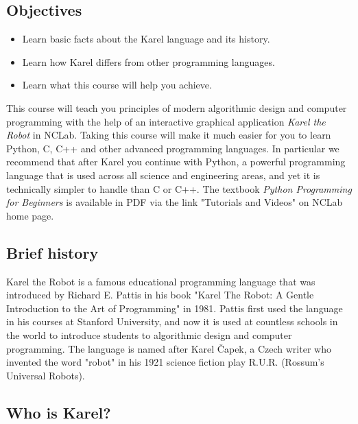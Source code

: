 \documentclass[article,A4,12pt]{llncs}
\begin{document}
\subsection{Objectives} 

\begin{itemize}
\item Learn basic facts about the Karel language and its history. 
\item Learn how Karel differs from other programming languages.
\item Learn what this course will help you achieve.
\end{itemize}
This course will teach you principles of modern algorithmic design and  
computer programming with the help of an interactive graphical application 
{\em Karel the Robot} in NCLab. Taking this course will make it much easier 
for you to learn Python, C, C++ and other advanced programming languages. In particular we 
recommend that after Karel you continue with Python, a powerful programming 
language that is used across all science and engineering areas, and yet it is 
technically simpler to handle than C or C++. The textbook
{\em Python Programming for Beginners} is available in PDF via the link 
"Tutorials and Videos" on NCLab home page.

\subsection{Brief history}

Karel the Robot is a famous educational programming language that was introduced by Richard E. 
Pattis in his book "Karel The Robot: A Gentle Introduction to the Art of Programming" in 1981. 
Pattis first used the language in his courses at Stanford University, and now it is used at 
countless schools in the world to introduce students to algorithmic design and computer programming. 
The language is named after Karel \v{C}apek, a Czech writer who invented the word "robot" in his 1921 
science fiction play R.U.R. (Rossum's Universal Robots).

\subsection{Who is Karel?}
\end{document}
